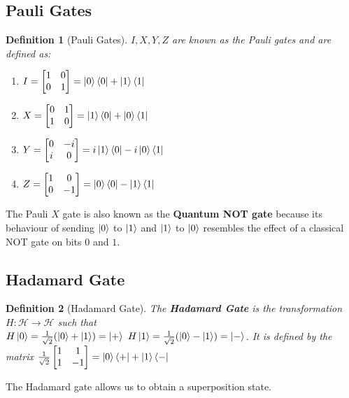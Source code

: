 \documentclass[12pt,twoside,fleqn]{report}
\theoremstyle{thmstyle}
\newtheorem{defn}{Definition}[chapter]
\begin{document}
\subsection{Pauli Gates}
\begin{defn}[Pauli Gates]
    $I, X, Y, Z$ are known as the Pauli gates and are defined as:
    \begin{enumerate}
        \item $I = \begin{bmatrix} 1 & 0 \\ 0 & 1 \end{bmatrix} = \ket{0}\bra{0} + \ket{1}\bra{1}$
        \item $X = \begin{bmatrix} 0 & 1 \\ 1 & 0 \end{bmatrix} = \ket{1}\bra{0} + \ket{0}\bra{1}$
        \item $Y = \begin{bmatrix} 0 & -i \\ i & 0 \end{bmatrix} = i \ket{1}\bra{0} - i \ket{0}\bra{1}$
        \item $Z = \begin{bmatrix} 1 & 0 \\ 0 & -1 \end{bmatrix} = \ket{0}\bra{0} - \ket{1}\bra{1}$
    \end{enumerate}
\end{defn}

The Pauli $X$ gate is also known as the \textbf{Quantum NOT gate} because its behaviour of sending $\ket{0}$ to $\ket{1}$ and $\ket{1}$ to $\ket{0}$ resembles the effect of a classical NOT gate on bits $0$ and $1$.


\subsection{Hadamard Gate}
\begin{defn}[Hadamard Gate]
    The \textbf{Hadamard Gate} is the transformation $H: \mathcal{H} \to \mathcal{H}$ such that \\
    $H \ket{0} = \frac{1}{\sqrt{2}} (\ket{0} + \ket{1}) = \ket{+}$
    $H \ket{1} = \frac{1}{\sqrt{2}} (\ket{0} - \ket{1}) = \ket{-}$.  It is defined by the matrix
    $\frac{1}{\sqrt{2}} \begin{bmatrix} 1 & 1 \\ 1 & -1 \end{bmatrix} = \ket{0}\bra{+} + \ket{1}\bra{-}$
\end{defn}
The Hadamard gate allows us to obtain a superposition state.
\end{document}

